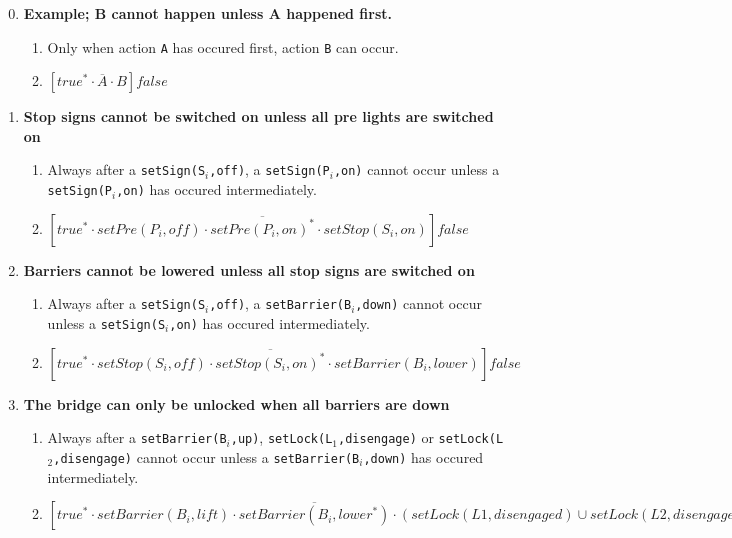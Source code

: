 \begin{enumerate}
  \setcounter{enumi}{-1}
  
  
  \item \textbf{Example; B cannot happen unless A happened first.}
  \begin{enumerate}
		\item Only when action \texttt{A} has occured first, action \texttt{B} can occur.
		\item $[true^* \cdot \overline{A} \cdot B]false$ 
	\end{enumerate}

	\item \textbf{Stop signs cannot be switched on unless all pre lights are switched on}
	\begin{enumerate}
		\item Always after a \texttt{setSign(S$_i$,off)}, a \texttt{setSign(P$_i$,on)} cannot occur unless a \texttt{setSign(P$_i$,on)} has occured intermediately.
		\item $[true^* \cdot setPre(P_i, off) \cdot \overline{setPre(P_i, on)^{*}} \cdot setStop(S_i, on)]false$
	\end{enumerate}
		
	\item \textbf{Barriers cannot be lowered unless all stop signs are switched on}
	\begin{enumerate}
		\item Always after a \texttt{setSign(S$_i$,off)}, a \texttt{setBarrier(B$_i$,down)} cannot occur unless a \texttt{setSign(S$_i$,on)} has occured intermediately.
		\item $[true^* \cdot setStop(S_i, off) \cdot \overline{setStop(S_i, on)^{*}} \cdot setBarrier(B_i, lower)]false$
	\end{enumerate}
	
	\item \textbf{The bridge can only be unlocked when all barriers are down}
	\begin{enumerate}
		\item Always after a \texttt{setBarrier(B$_i$,up)}, \texttt{setLock(L$_1$,disengage)} or \texttt{setLock(L$_2$,disengage)} cannot occur unless a \texttt{setBarrier(B$_i$,down)} has occured intermediately.
		\item $[true^* \cdot setBarrier(B_i, lift) \cdot \overline{setBarrier(B_i, lower^{*})} \cdot (setLock(L1, disengaged)\cup setLock(L2, disengage))]false$
	\end{enumerate}
		

\end{enumerate}

